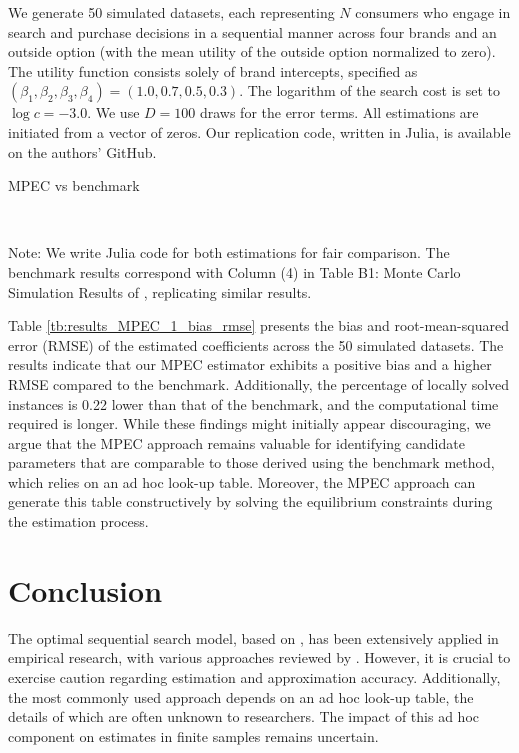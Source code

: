 \documentclass[12pt]{article}
\begin{document}
We generate 50 simulated datasets, each representing $N$ consumers who engage in search and purchase decisions in a sequential manner across four brands and an outside option (with the mean utility of the outside option normalized to zero). The utility function consists solely of brand intercepts, specified as \((\beta_1,\beta_2,\beta_3,\beta_4) = (1.0, 0.7, 0.5, 0.3)\). The logarithm of the search cost is set to \(\log c = -3.0\). We use \(D = 100\) draws for the error terms. All estimations are initiated from a vector of zeros. Our replication code, written in Julia, is available on the authors' GitHub.


\begin{table}[!htbp]
  \begin{center}
      \caption{MPEC vs benchmark}
      \label{tb:results_MPEC_1_bias_rmse} 
      \subfloat[scale $N=500$]{}\\
      \subfloat[scale $N=1000$]{}
  \end{center}
  \footnotesize
  Note: We write Julia code for both estimations for fair comparison. The benchmark results correspond with Column (4) in Table B1: Monte Carlo Simulation Results of \cite{ursu2023sequential}, replicating similar results.
\end{table} 

Table \ref{tb:results_MPEC_1_bias_rmse} presents the bias and root-mean-squared error (RMSE) of the estimated coefficients across the 50 simulated datasets. The results indicate that our MPEC estimator exhibits a positive bias and a higher RMSE compared to the benchmark. Additionally, the percentage of locally solved instances is 0.22 lower than that of the benchmark, and the computational time required is longer. While these findings might initially appear discouraging, we argue that the MPEC approach remains valuable for identifying candidate parameters that are comparable to those derived using the benchmark method, which relies on an ad hoc look-up table. Moreover, the MPEC approach can generate this table constructively by solving the equilibrium constraints during the estimation process.

\section{Conclusion}

The optimal sequential search model, based on \cite{weitzman1979optimal}, has been extensively applied in empirical research, with various approaches reviewed by \cite{ursu2023sequential}. However, it is crucial to exercise caution regarding estimation and approximation accuracy. Additionally, the most commonly used approach depends on an ad hoc look-up table, the details of which are often unknown to researchers. The impact of this ad hoc component on estimates in finite samples remains uncertain.
\end{document}
